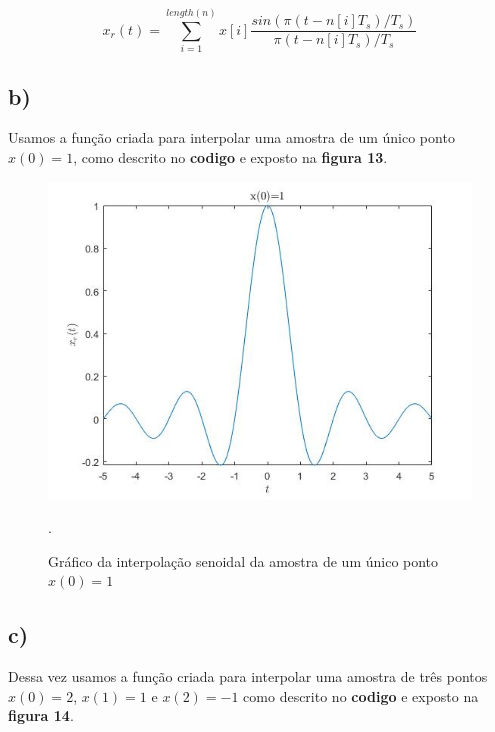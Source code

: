 \documentclass[a4paper, 12pt]{article}
\begin{document}
$$x_r(t) = \sum_{i=1}^{length(n)}x[i]\frac{sin(\pi (t - n[i]T_s)/T_s)}{\pi (t - n[i]T_s)/T_s}$$ 



\subsection{b)}

Usamos a função criada para interpolar uma amostra de um único ponto $x(0)=1$, como descrito no \textbf{codigo} e exposto na \textbf{figura 13}.



\begin{figure}[H]
	\centering
	\includegraphics[scale=0.6]{../Imagens/ex6/b.jpg} 
	\caption{Gráfico da interpolação senoidal da amostra de um único ponto $x(0)=1$}.
	\label{fig:6b}
\end{figure}

\subsection{c)}

Dessa vez usamos a função criada para interpolar uma amostra de três pontos $x(0)=2$, $x(1)=1$ e $x(2)=-1$ como descrito no \textbf{codigo} e exposto na \textbf{figura 14}.
\end{document}
